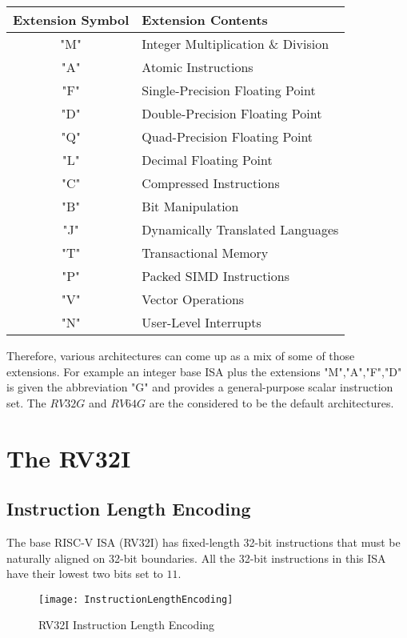 	\begin{tabular}{|c|p{2in}|} \hline
	\setrow{\bfseries}Extension Symbol &\setrow{\bfseries} Extension Contents \\\hline
		"M" & Integer Multiplication \& Division     \\\hline
		"A" & Atomic Instructions 				     \\\hline
		"F" & Single-Precision Floating Point		 \\\hline
		"D" & Double-Precision Floating Point 		 \\\hline
		"Q" & Quad-Precision Floating Point          \\\hline
		"L" & Decimal Floating Point                 \\\hline
		"C" & Compressed Instructions                \\\hline
		"B" & Bit Manipulation 					     \\\hline
		"J" & Dynamically Translated Languages 		 \\\hline
		"T" & Transactional Memory 					 \\\hline
		"P" & Packed SIMD Instructions 			     \\\hline
		"V" & Vector Operations 					 \\\hline
		"N" & User-Level Interrupts					 \\\hline
	\end{tabular}
	\vspace{5mm}
	\par
	Therefore, various architectures can come up as a mix of some of those extensions. For example an integer base ISA plus the extensions "M","A","F","D" is given the abbreviation "G" and provides a general-purpose scalar instruction set. The $RV32G$ and $RV64G$ are the considered to be the default architectures.
	
	\section{The RV32I}
	\label{sec:RV32I}
	\subsection{Instruction Length Encoding}
	\label{subsec:ILE}
	The base RISC-V ISA (RV32I) has fixed-length 32-bit instructions that must be naturally aligned on 32-bit boundaries. All the 32-bit instructions in this ISA have their lowest two bits set to $11$.
	\vspace{3mm}
	\begin{figure}[h!]
		
		\begin{center}
		\texttt{[image: InstructionLengthEncoding]}
		\caption{RV32I Instruction Length Encoding}
		\label{image2.1}
		\end{center}
	\end{figure}
